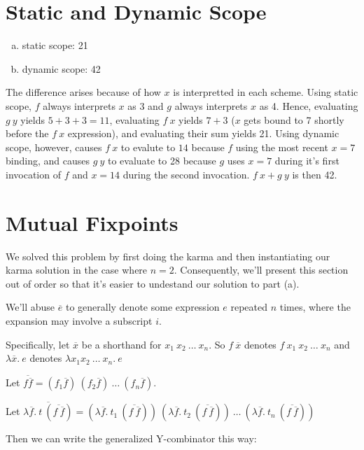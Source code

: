 \documentclass[10pt]{article}
\begin{document}
\section{Static and Dynamic Scope}%
\begin{enumerate}[(a)]
    \item static scope: 21
    \item dynamic scope: 42
\end{enumerate}
The difference arises because of how $x$ is interpretted in each scheme. Using
static scope, $f$ always interprets $x$ as 3 and $g$ always interprets $x$ as 4.
Hence, evaluating $g~y$ yields $5 + 3 + 3 = 11$, evaluating $f~x$ yields
$7 + 3$ ($x$ gets bound to 7 shortly before the $f~x$ expression), and evaluating
their sum yields 21. Using dynamic scope, however, causes $f~x$ to evalute to
$14$ because $f$ using the most recent $x = 7$ binding, and causes $g~y$ to
evaluate to 28 because $g$ uses $x = 7$ during it's first invocation of $f$ and
$x = 14$ during the second invocation. $f~x + g~y$ is then 42.

\section{Mutual Fixpoints}%
We solved this problem by first doing the karma and then instantiating our
karma solution in the case where $n = 2$. Consequently, we'll present this
section out of order so that it's easier to undestand our solution to part (a).

We'll abuse $\overline{e}$ to generally denote some expression $e$ repeated $n$
times, where the expansion may involve a subscript $i$.

Specifically, let $\overline{x}$ be a shorthand for $x_1~x_2~\ldots~x_n$. So $f~\overline{x}$
denotes $f~x_1~x_2~\ldots~x_n$ and $\lambda \overline{x}.~e$ denotes $\lambda x_1 x_2~\ldots~x_n.~e$

Let $\overline{{f \overline{f}}} = (f_1 \overline{f})~(f_2 \overline{f})~\ldots~(f_n \overline{f})$.

Let $\overline{\lambda \overline{f}.~t~(\overline{f~\overline{f}})}
= (\lambda \overline{f}.~t_1~(\overline{f~\overline{f}}))
  ~(\lambda \overline{f}.~t_2~(\overline{f~\overline{f}}))
  ~\ldots
  ~(\lambda \overline{f}.~t_n~(\overline{f~\overline{f}}))$

Then we can write the generalized Y-combinator this way:
\end{document}

